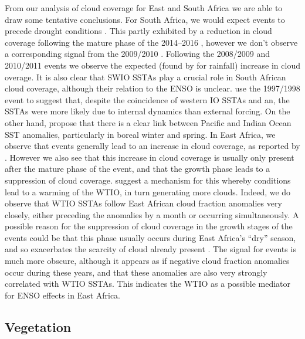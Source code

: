 From our analysis of cloud coverage for East and South Africa we are
able to draw some tentative conclusions. For South Africa, we would
expect \elnino{} events to precede drought conditions
\cite{nicholson2000}. This partly exhibited by a reduction in cloud coverage
following the mature phase of the 2014--2016 \elnino{}, however we
don't observe a corresponding signal from the 2009/2010
\elnino{}. Following the 2008/2009 and 2010/2011 \nina{} events we
observe the expected (found by \cite{nicholson2000} for rainfall)
increase in cloud overage. It is also clear that SWIO SSTAs play a
crucial role in South African cloud coverage, although their relation
to the ENSO is unclear. \cite{webster1999} use the 1997/1998 \elnino{}
event to suggest that, despite the coincidence of western IO SSTAs and
an, the SSTAs were more likely due to internal dynamics than external
forcing. On the other hand, \cite{alexander2002} propose that there is
a clear link between Pacific and Indian Ocean SST anomalies,
particularly in boreal winter and spring. In East Africa, we observe
that \elnino{} events generally lead to an increase in cloud coverage,
as reported by \cite{warren2007}. However we also see that this increase in
cloud coverage is usually only present after the mature phase of the
\elnino{} event, and that the growth phase leads to a suppression of
cloud coverage. \cite{parhi2016} suggest a mechanism for this whereby
\elnino{} conditions lead to a warming of the WTIO, in turn generating
more clouds. Indeed, we do observe that WTIO SSTAs follow East African
cloud fraction anomalies very closely, either preceding the anomalies
by a month or occurring simultaneously. A possible reason for the
suppression of cloud coverage in the growth stages of the \elnino{}
events could be that this phase usually occurs during East Africa's
``dry'' season, and so exacerbates the scarcity of cloud already present
\citep{parhi2016}. The signal for \nina{} events is much more obscure,
although it appears as if negative cloud fraction anomalies occur
during these years, and that these anomalies are also very strongly
correlated with WTIO SSTAs. This indicates the WTIO as a possible
mediator for ENSO effects in East Africa.

\subsection{Vegetation}
\label{sec:disc:ndvi}

